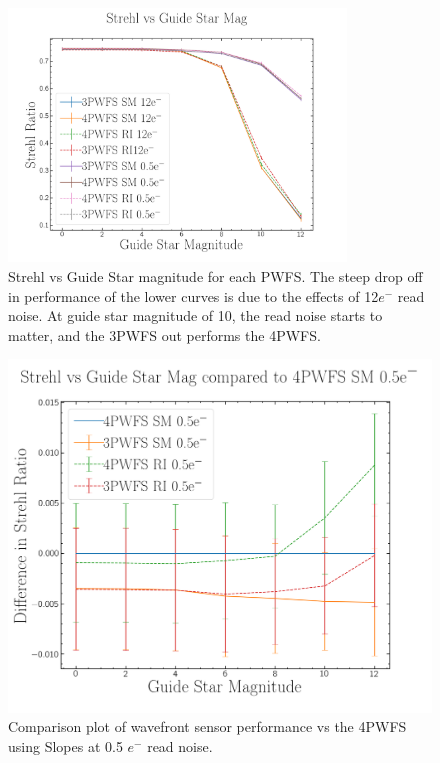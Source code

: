 \begin{figure}[h]
    \centering
    \includegraphics[width=0.8\textwidth]{Chapter Materials/Chapter Four Materials/StrehlvGuideStar4v3.png}
    \caption{Strehl vs Guide Star magnitude for each PWFS. The steep drop off in performance of the lower curves is due to the effects of 12$e^-$ read noise. At guide star magnitude of 10, the read noise starts to matter, and the 3PWFS out performs the 4PWFS. }
    \label{fig:overall}
\end{figure}


\begin{figure}[h]
    \centering
    \includegraphics[width=.7\linewidth]{Chapter Materials/Chapter Four Materials/StrehlvGuideStarvs4PWFSRM0e.png}
    \caption{Comparison plot of wavefront sensor performance vs the 4PWFS using Slopes at 0.5 $e^-$ read noise. }
    \label{fig:0RN}
\end{figure}

